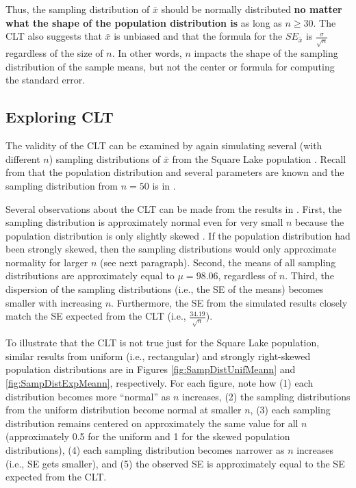 \documentclass[10pt,openany]{book}\usepackage[]{graphicx}\usepackage[]{color}
\begin{document}
Thus, the sampling distribution of $\bar{x}$ should be normally distributed \textbf{no matter what the shape of the population distribution is} as long as $n\geq30$.  The CLT also suggests that $\bar{x}$ is unbiased and that the formula for the $SE_{\bar{x}}$ is $\frac{\sigma}{\sqrt{n}}$ regardless of the size of $n$.  In other words, $n$ impacts the shape of the sampling distribution of the sample means, but not the center or formula for computing the standard error.


\subsection{Exploring CLT}
\vspace{-12pt}
The validity of the CLT can be examined by again simulating several (with different $n$) sampling distributions of $\bar{x}$ from the Square Lake population . Recall from  that the population distribution  and several parameters  are known and the sampling distribution from $n=50$ is in .

Several observations about the CLT can be made from the results in .  First, the sampling distribution is approximately normal even for very small $n$ because the population distribution is only slightly skewed . If the population distribution had been strongly skewed, then the sampling distributions would only approximate normality for larger $n$ (see next paragraph).  Second, the means of all sampling distributions are approximately equal to $\mu=98.06$, regardless of $n$.  Third, the dispersion of the sampling distributions (i.e., the SE of the means) becomes smaller with increasing $n$.  Furthermore, the SE from the simulated results closely match the SE expected from the CLT (i.e., $\frac{34.19}{\sqrt{n}}$).

To illustrate that the CLT is not true just for the Square Lake population, similar results from uniform (i.e., rectangular) and strongly right-skewed population distributions are in Figures \ref{fig:SampDistUnifMeann} and \ref{fig:SampDistExpMeann}, respectively. For each figure, note how (1) each distribution becomes more ``normal'' as $n$ increases, (2) the sampling distributions from the uniform distribution become normal at smaller $n$, (3) each sampling distribution remains centered on approximately the same value for all $n$ (approximately 0.5 for the uniform and 1 for the skewed population distributions), (4) each sampling distribution becomes narrower as $n$ increases (i.e., SE gets smaller), and (5) the observed SE is approximately equal to the SE expected from the CLT.
\end{document}
